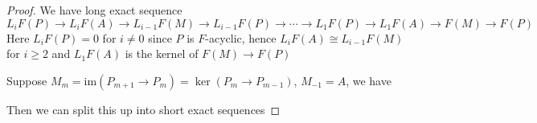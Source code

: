 \documentclass{article}
\theoremstyle{definition}
\theoremstyle{remark}
\theoremstyle{definition}
\begin{document}
\begin{proof}
We have long exact sequence
\[L_iF(P)\to L_iF(A)\to L_{i-1}F(M)\to L_{i-1}F(P)\to\cdots\to L_1F(P)\to L_1F(A)\to F(M)\to F(P)\]
Here $L_iF(P)=0$ for $i\neq0$ since $P$ is $F$-acyclic, hence $L_iF(A)\cong L_{i-1}F(M)$ for $i\geq2$ and $L_1F(A)$ is the kernel of $F(M)\to F(P)$ \par
Suppose $M_m=\mathrm{im}(P_{m+1}\to P_m)=\ker(P_m\to P_{m-1})$, $M_{-1}=A$, we have
\begin{center}
\end{center}
Then we can split this up into short exact sequences

\end{proof}
\end{document}

